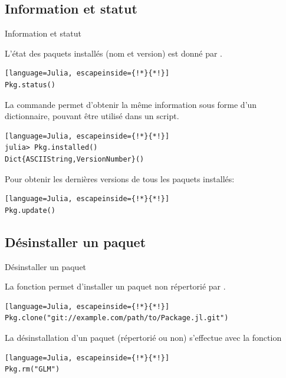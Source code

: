 \subsection{Information et statut}
\begin{frame}[containsverbatim]{Information et statut}
\par{L'état des paquets installés (nom et version) est donné par .}
\begin{lstlisting}[language=Julia, escapeinside={!*}{*!}]
Pkg.status()
\end{lstlisting}
\vspace{2ex}
\par{La commande  permet d'obtenir la même information sous forme d'un dictionnaire, pouvant être utilisé dans un script.}
\begin{lstlisting}[language=Julia, escapeinside={!*}{*!}]
julia> Pkg.installed()
Dict{ASCIIString,VersionNumber}()
\end{lstlisting}
\vspace{2ex}
\par{Pour obtenir les dernières versions de tous les paquets installés:}
\begin{lstlisting}[language=Julia, escapeinside={!*}{*!}]
Pkg.update()
\end{lstlisting}
\end{frame}


\subsection{Désinstaller un paquet}
\begin{frame}[containsverbatim]{Désinstaller un paquet}
\par{La fonction  permet d'installer un paquet non répertorié par {\Julia}.}
\begin{lstlisting}[language=Julia, escapeinside={!*}{*!}]
Pkg.clone("git://example.com/path/to/Package.jl.git")
\end{lstlisting}
\vspace{2ex}
\par{La désinstallation d'un paquet (répertorié ou non) s'effectue avec la fonction }
\begin{lstlisting}[language=Julia, escapeinside={!*}{*!}]
Pkg.rm("GLM")
\end{lstlisting}
\end{frame}


